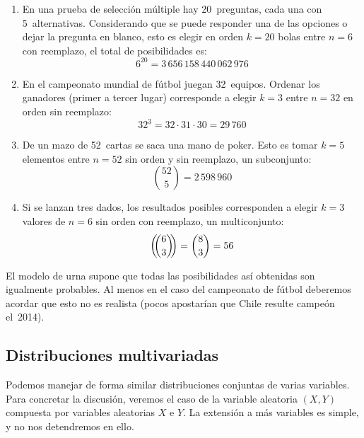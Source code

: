   \begin{enumerate}
  \item
    En una prueba de selección múltiple hay 20~preguntas,
    cada una con 5~alternativas.
    Considerando que se puede responder una de las opciones
    o dejar la pregunta en blanco,
    esto es elegir en orden \(k = 20\) bolas entre \(n = 6\)
    con reemplazo,
    el total de posibilidades es:
    \begin{equation*}
      6^{20}
	= 3\,656\,158\,440\,062\,976
    \end{equation*}
  \item
    En el campeonato mundial de fútbol juegan 32~equipos.
    Ordenar los ganadores
    (primer a tercer lugar)
    corresponde a elegir \(k = 3\) entre \(n = 32\)
    en orden sin reemplazo:
    \begin{equation*}
      32^{\underline{3}}
	= 32 \cdot 31 \cdot 30
	= 29\,760
    \end{equation*}
  \item
    De un mazo de 52~cartas se saca una mano de poker.
    Esto es tomar \(k = 5\) elementos entre \(n = 52\)
    sin orden y sin reemplazo,
    un subconjunto:
    \begin{equation*}
      \binom{52}{5}
	= 2\,598\,960
    \end{equation*}
  \item
    Si se lanzan tres dados,
    los resultados posibles corresponden a elegir \(k = 3\) valores
    de \(n = 6\) sin orden con reemplazo,
    un multiconjunto:
    \begin{equation*}
      \left( \!\! \binom{6}{3} \!\! \right)
	= \binom{8}{3}
	= 56
    \end{equation*}
  \end{enumerate}
  El modelo de urna supone que todas las posibilidades así obtenidas
  son igualmente probables.
  Al menos en el caso del campeonato de fútbol deberemos acordar
  que esto no es realista
  (pocos apostarían que Chile resulte campeón el~2014).

\subsection{Distribuciones multivariadas}
\label{sec:multivariable-distributions}

  Podemos manejar de forma similar
  distribuciones conjuntas de varias variables.
  Para concretar la discusión,
  veremos el caso de la variable aleatoria \((X, Y)\)%
  compuesta por variables aleatorias \(X\) e \(Y\).
  La extensión a más variables es simple,
  y no nos detendremos en ello.

